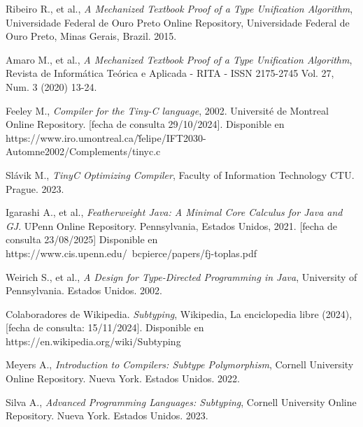 \begin{thebibliography}{11}
   
    \bibitem{}
    \label{sec:124}
    \hypertarget{124}{}
    Ribeiro R., et al., \textit{A Mechanized Textbook Proof of a Type Unification Algorithm},  Universidade Federal de Ouro Preto Online Repository, Universidade Federal de Ouro Preto, Minas Gerais, Brazil. 2015.

    \bibitem{}
    \label{sec:125}
    \hypertarget{125}{}
    Amaro M., et al., \textit{A Mechanized Textbook Proof of a Type Unification Algorithm},  Revista de Informática Teórica e Aplicada - RITA - ISSN 2175-2745  Vol. 27, Num. 3 (2020) 13-24.

    \bibitem{}
    \label{sec:126}
    \hypertarget{126}{}
     Feeley M., \textit{Compiler for the Tiny-C language}, 2002. Université de Montreal Online Repository.  [fecha de consulta 29/10/2024]. Disponible en https://www.iro.umontreal.ca/\~felipe/IFT2030-Automne2002/Complements/tinyc.c

    \bibitem{}
    \label{sec:127}
    \hypertarget{127}{}
     Slávik M., \textit{TinyC Optimizing Compiler},  Faculty of Information Technology CTU. Prague. 2023.

 \bibitem{}
    \label{sec:142}
    \hypertarget{142}{}
	Igarashi A., et al., \textit{Featherweight Java: A Minimal Core Calculus for Java and GJ}.  UPenn Online Repository.  Pennsylvania, Estados Unidos, 2021.  [fecha de consulta 23/08/2025] Disponible en https://www.cis.upenn.edu/~bcpierce/papers/fj-toplas.pdf 

    \bibitem{}
    \label{sec:129}
    \hypertarget{129}{}
    Weirich S., et al., \textit{A Design for Type-Directed Programming in Java},  University of Pennsylvania. Estados Unidos. 2002.

    \bibitem{}
    \label{sec:130}
    \hypertarget{130}{}
    Colaboradores de Wikipedia. \textit{Subtyping},  Wikipedia, La enciclopedia libre (2024), [fecha de consulta: 15/11/2024]. Disponible en https://en.wikipedia.org/wiki/Subtyping

    \bibitem{}
    \label{sec:131}
    \hypertarget{131}{}
    Meyers A., \textit{Introduction to Compilers: Subtype Polymorphism}, Cornell University Online Repository. Nueva York. Estados Unidos. 2022.

    \bibitem{}
    \label{sec:132}
    \hypertarget{132}{}
    Silva A., \textit{Advanced Programming Languages: Subtyping}, Cornell University Online Repository. Nueva York. Estados Unidos. 2023.


\end{thebibliography}
